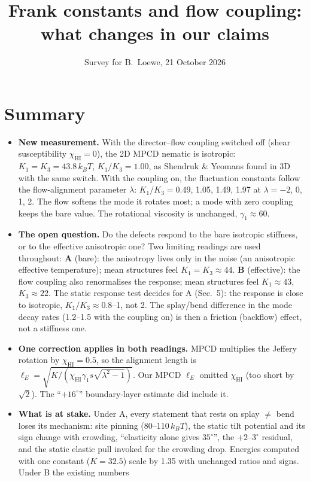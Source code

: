\documentclass[11pt,a4paper]{article}
\title{Frank constants and flow coupling:\\ what changes in our claims}
\author{Survey for B.~Loewe, 21 October 2026}
\date{}
\newcommand{\kT}{k_BT}\newcommand{\half}{\tfrac12}\newcommand{\la}{\ell_a}
\begin{document}
\maketitle

\section*{Summary}
\begin{itemize}
\item \textbf{New measurement.} With the director--flow coupling switched off (shear susceptibility $\chi_\mathrm{HI}=0$), the 2D MPCD nematic is isotropic:
$K_1=K_3=43.8\,\kT$, $K_1/K_3=1.00$, as Shendruk \& Yeomans found in 3D with the same switch. With the coupling on, the fluctuation constants follow the
flow-alignment parameter $\lambda$: $K_1/K_3=0.49$, 1.05, 1.49, 1.97 at $\lambda=-2$, 0, 1, 2. The flow softens the mode it rotates most; a mode with zero
coupling keeps the bare value. The rotational viscosity is unchanged, $\gamma_1\approx60$.
\item \textbf{The open question.} Do the defects respond to the bare isotropic stiffness, or to the effective anisotropic one? Two limiting readings
are used throughout:
\textbf{A} (bare): the anisotropy lives only in the noise (an anisotropic effective temperature); mean structures feel $K_1=K_3\approx44$.
\textbf{B} (effective): the flow coupling also renormalises the response; mean structures feel $K_1\approx43$, $K_3\approx22$.
The static response test decides for A (Sec.~5): the response is close to isotropic, $K_1/K_3\approx0.8$--1, not 2. The splay/bend
difference in the mode decay rates (1.2--1.5 with the coupling on) is then a friction (backflow) effect, not a stiffness one.
\item \textbf{One correction applies in both readings.} MPCD multiplies the Jeffery rotation by $\chi_\mathrm{HI}=0.5$, so the alignment length is
$\ell_E=\sqrt{K/(\chi_\mathrm{HI}\gamma_1 s\sqrt{\lambda^2-1})}$. Our MPCD $\ell_E$ omitted $\chi_\mathrm{HI}$ (too short by $\sqrt2$). The ``$+16^\circ$''
boundary-layer estimate did include it.
\item \textbf{What is at stake.} Under A, every statement that rests on splay $\neq$ bend loses its mechanism: site pinning (80--110\,$\kT$), the static tilt
potential and its sign change with crowding, ``elasticity alone gives $35^\circ$'', the $+2$--$3^\circ$ residual, and the static elastic pull invoked
for the crowding drop. Energies computed with one constant ($K=32.5$) scale by 1.35 with unchanged ratios and signs. Under B the existing numbers

\end{itemize}
\end{document}
